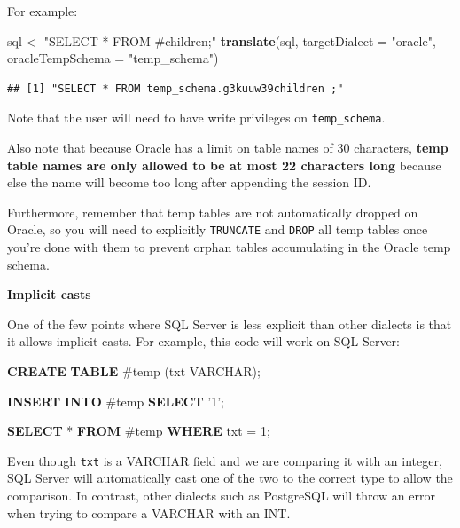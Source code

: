 \documentclass[11pt]{book}
\newenvironment{Shaded}{\begin{snugshade}}{\end{snugshade}}
\newcommand{\KeywordTok}[1]{\textcolor[rgb]{0.13,0.29,0.53}{\textbf{#1}}}
\newcommand{\DataTypeTok}[1]{\textcolor[rgb]{0.13,0.29,0.53}{#1}}
\newcommand{\DecValTok}[1]{\textcolor[rgb]{0.00,0.00,0.81}{#1}}
\newcommand{\StringTok}[1]{\textcolor[rgb]{0.31,0.60,0.02}{#1}}
\newcommand{\NormalTok}[1]{#1}
\begin{document}
For example:

\begin{Shaded}
\begin{Highlighting}[]
\NormalTok{sql <-}\StringTok{ "SELECT * FROM #children;"}
\KeywordTok{translate}\NormalTok{(sql, }\DataTypeTok{targetDialect =} \StringTok{"oracle"}\NormalTok{, }\DataTypeTok{oracleTempSchema =} \StringTok{"temp_schema"}\NormalTok{)}
\end{Highlighting}
\end{Shaded}

\begin{verbatim}
## [1] "SELECT * FROM temp_schema.g3kuuw39children ;"
\end{verbatim}

Note that the user will need to have write privileges on
\texttt{temp\_schema}.

Also note that because Oracle has a limit on table names of 30
characters, \textbf{temp table names are only allowed to be at most 22
characters long} because else the name will become too long after
appending the session ID.

Furthermore, remember that temp tables are not automatically dropped on
Oracle, so you will need to explicitly \texttt{TRUNCATE} and
\texttt{DROP} all temp tables once you're done with them to prevent
orphan tables accumulating in the Oracle temp schema.

\textbf{Implicit casts}

One of the few points where SQL Server is less explicit than other
dialects is that it allows implicit casts. For example, this code will
work on SQL Server:

\begin{Shaded}
\begin{Highlighting}[]
\KeywordTok{CREATE} \KeywordTok{TABLE}\NormalTok{ #temp (txt }\DataTypeTok{VARCHAR}\NormalTok{);}

\KeywordTok{INSERT} \KeywordTok{INTO}\NormalTok{ #temp}
\KeywordTok{SELECT} \StringTok{'1'}\NormalTok{;}

\KeywordTok{SELECT}\NormalTok{ * }\KeywordTok{FROM}\NormalTok{ #temp }\KeywordTok{WHERE}\NormalTok{ txt = }\DecValTok{1}\NormalTok{;}
\end{Highlighting}
\end{Shaded}

Even though \texttt{txt} is a VARCHAR field and we are comparing it with
an integer, SQL Server will automatically cast one of the two to the
correct type to allow the comparison. In contrast, other dialects such
as PostgreSQL will throw an error when trying to compare a VARCHAR with
an INT.
\end{document}
